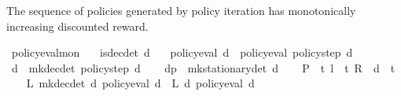 \begin{isabellebody}
\endisatagproof
{\isafoldproof}%
%
\isadelimproof
%
\endisadelimproof
%
\begin{isamarkuptext}%
The sequence of policies generated by policy iteration has monotonically increasing 
discounted reward.%
\end{isamarkuptext}\isamarkuptrue%
\isamarkupfalse%
\ policy{\isacharunderscore}{\kern0pt}eval{\isacharunderscore}{\kern0pt}mon{\isacharcolon}{\kern0pt}\isanewline
\ \ \ {\isachardoublequoteopen}is{\isacharunderscore}{\kern0pt}dec{\isacharunderscore}{\kern0pt}det\ d{\isachardoublequoteclose}\isanewline
\ \ \ {\isachardoublequoteopen}policy{\isacharunderscore}{\kern0pt}eval\ d\ {\isasymle}\ policy{\isacharunderscore}{\kern0pt}eval\ {\isacharparenleft}{\kern0pt}policy{\isacharunderscore}{\kern0pt}step\ d{\isacharparenright}{\kern0pt}{\isachardoublequoteclose}\isanewline
%
\isadelimproof
%
\endisadelimproof
%
\isatagproof
{}\isamarkupfalse%
\ {\isacharminus}{\kern0pt}\isanewline
\ \ \isamarkupfalse%
\ {\isacharquery}{\kern0pt}d{\isacharprime}{\kern0pt}\ {\isacharequal}{\kern0pt}\ {\isachardoublequoteopen}mk{\isacharunderscore}{\kern0pt}dec{\isacharunderscore}{\kern0pt}det\ {\isacharparenleft}{\kern0pt}policy{\isacharunderscore}{\kern0pt}step\ d{\isacharparenright}{\kern0pt}{\isachardoublequoteclose}\isanewline
\ \ \isamarkupfalse%
\ {\isacharquery}{\kern0pt}dp\ {\isacharequal}{\kern0pt}\ {\isachardoublequoteopen}mk{\isacharunderscore}{\kern0pt}stationary{\isacharunderscore}{\kern0pt}det\ d{\isachardoublequoteclose}\isanewline
\ \ \isamarkupfalse%
\ {\isacharquery}{\kern0pt}P\ {\isacharequal}{\kern0pt}\ {\isachardoublequoteopen}{\isasymSum}t{\isachardot}{\kern0pt}\ l\ {\isacharcircum}{\kern0pt}\ t\ {\isacharasterisk}{\kern0pt}\isactrlsub R\ {\isasymP}\ {\isacharquery}{\kern0pt}d{\isacharprime}{\kern0pt}\ {\isacharcircum}{\kern0pt}{\isacharcircum}{\kern0pt}\ t{\isachardoublequoteclose}\isanewline
\isanewline
\ \ \isamarkupfalse%
\ {\isachardoublequoteopen}L\ {\isacharparenleft}{\kern0pt}mk{\isacharunderscore}{\kern0pt}dec{\isacharunderscore}{\kern0pt}det\ d{\isacharparenright}{\kern0pt}\ {\isacharparenleft}{\kern0pt}policy{\isacharunderscore}{\kern0pt}eval\ d{\isacharparenright}{\kern0pt}\ {\isasymle}\ L\ {\isacharquery}{\kern0pt}d{\isacharprime}{\kern0pt}\ {\isacharparenleft}{\kern0pt}policy{\isacharunderscore}{\kern0pt}eval\ d{\isacharparenright}{\kern0pt}{\isachardoublequoteclose}\isanewline
\ \ \ \ \isamarkupfalse%

\end{isabellebody}
